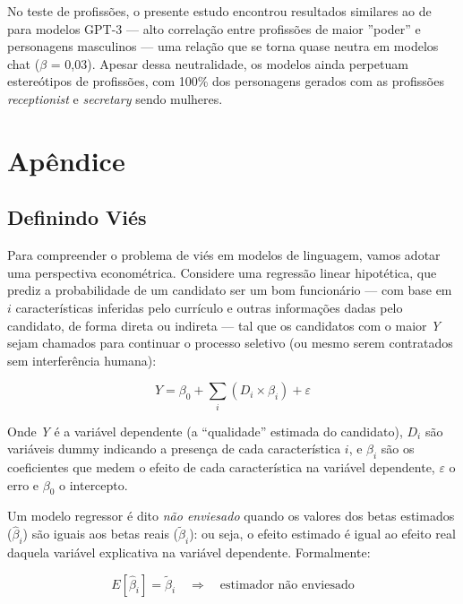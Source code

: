 \documentclass[12pt,a4paper]{article}
\begin{document}
No teste de profissões, o presente estudo encontrou resultados similares
ao de \citet{lucy2021} para modelos GPT-3 --- alto correlação entre
profissões de maior ''poder'' e personagens masculinos --- uma relação que
se torna quase neutra em modelos chat ($\beta$ = 0,03). Apesar dessa
neutralidade, os modelos ainda perpetuam estereótipos de profissões, com
100\% dos personagens gerados com as profissões \textit{receptionist} e
\textit{secretary} sendo mulheres.


\section{Apêndice}



\subsection{Definindo Viés}




Para compreender o problema de viés em modelos de linguagem, vamos
adotar uma perspectiva econométrica. Considere uma regressão linear
hipotética, que prediz a probabilidade de um candidato ser um bom
funcionário --- com base em $i$ características inferidas pelo currículo
e outras informações dadas pelo candidato, de forma direta ou indireta
--- tal que os candidatos com o maior \textit{Y} sejam chamados para continuar
o processo seletivo (ou mesmo serem contratados sem interferência
humana):

\begin{equation}
Y = \beta_0 + \sum_i (D_i \times \beta_i) + \varepsilon
\end{equation}

Onde \textit{Y} é a variável dependente (a ``qualidade'' estimada do
candidato), $D_i$ são variáveis dummy indicando a presença de cada
característica $i$, e $\beta_i$ são os coeficientes que medem o efeito de
cada característica na variável dependente, $\varepsilon$ o erro e $\beta_0$ o
intercepto.

Um modelo regressor é dito \textit{não enviesado} quando os valores dos betas
estimados ($\hat{\beta}_i$) são iguais aos betas reais ($\tilde{\beta}_i$): ou seja, o efeito
estimado é igual ao efeito real daquela variável explicativa na variável
dependente. Formalmente:

\begin{equation}
E[\hat{\beta}_i] = \tilde{\beta}_i \quad \Rightarrow \quad \text{estimador não enviesado}
\end{equation}
\end{document}
